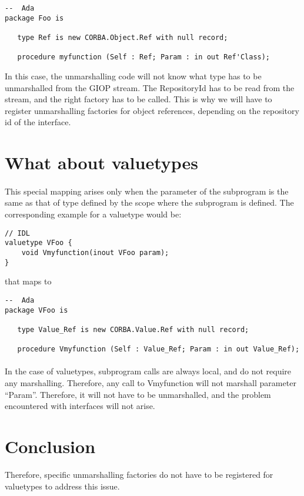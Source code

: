 \begin{verbatim}
--  Ada
package Foo is

   type Ref is new CORBA.Object.Ref with null record;

   procedure myfunction (Self : Ref; Param : in out Ref'Class);
\end{verbatim}


In this case, the unmarshalling code will not know what type has to be
unmarshalled from the GIOP stream. The RepositoryId has to be read
from the stream, and the right factory has to be called. This is why
we will have to register unmarshalling factories for object
references, depending on the repository id of the interface.

\section{What about valuetypes}

\paragraph{}This special mapping arises only when the parameter of the
subprogram is the same as that of type defined by the scope where the
subprogram is defined. The corresponding example for a valuetype would
be:


\begin{verbatim}
// IDL
valuetype VFoo {
    void Vmyfunction(inout VFoo param);
}
\end{verbatim}

that maps to

\begin{verbatim}
--  Ada
package VFoo is

   type Value_Ref is new CORBA.Value.Ref with null record;

   procedure Vmyfunction (Self : Value_Ref; Param : in out Value_Ref);
\end{verbatim}



\paragraph{}In the case of valuetypes, subprogram calls are always
local, and do not require any marshalling. Therefore, any call to
Vmyfunction will not marshall parameter ``Param''. Therefore, it will
not have to be unmarshalled, and the problem encountered with
interfaces will not arise.

\section{Conclusion}
Therefore, specific unmarshalling factories do not have to be
registered for valuetypes to address this issue.

